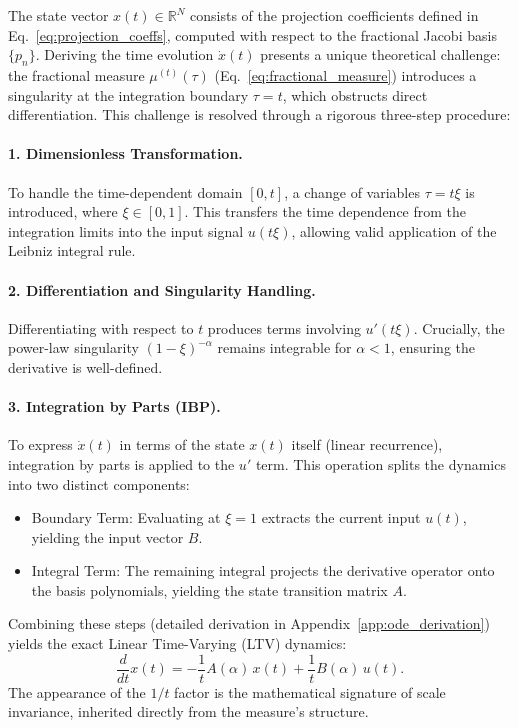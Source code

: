 \documentclass{article}
\theoremstyle{plain}
\theoremstyle{definition}
\theoremstyle{remark}
\begin{document}
The state vector $x(t) \in \mathbb{R}^N$ consists of the projection coefficients defined in Eq.~\eqref{eq:projection_coeffs}, computed with respect to the fractional Jacobi basis $\{p_n\}$.
Deriving the time evolution $\dot{x}(t)$ presents a unique theoretical challenge: the fractional measure $\mu^{(t)}(\tau)$ (Eq.~\ref{eq:fractional_measure}) introduces a singularity at the integration boundary $\tau=t$, which obstructs direct differentiation. This challenge is resolved through a rigorous three-step procedure:

\paragraph{1. Dimensionless Transformation.}
To handle the time-dependent domain $[0, t]$, a change of variables $\tau = t\xi$ is introduced, where $\xi \in [0, 1]$. This transfers the time dependence from the integration limits into the input signal $u(t\xi)$, allowing valid application of the Leibniz integral rule.

\paragraph{2. Differentiation and Singularity Handling.}
Differentiating with respect to $t$ produces terms involving $u'(t\xi)$. Crucially, the power-law singularity $(1-\xi)^{-\alpha}$ remains integrable for $\alpha < 1$, ensuring the derivative is well-defined.

\paragraph{3. Integration by Parts (IBP).}
To express $\dot{x}(t)$ in terms of the state $x(t)$ itself (linear recurrence), integration by parts is applied to the $u'$ term. This operation splits the dynamics into two distinct components:
\begin{itemize}
	\item Boundary Term: Evaluating at $\xi=1$ extracts the current input $u(t)$, yielding the input vector $B$.
	\item Integral Term: The remaining integral projects the derivative operator onto the basis polynomials, yielding the state transition matrix $A$.
\end{itemize}

Combining these steps (detailed derivation in Appendix~\ref{app:ode_derivation}) yields the exact Linear Time-Varying (LTV) dynamics:
\begin{equation}
	\frac{d}{dt} x(t) = -\frac{1}{t} A(\alpha) \, x(t) + \frac{1}{t} B(\alpha) \, u(t).
	\label{eq:hippo_ode}
\end{equation}
The appearance of the $1/t$ factor is the mathematical signature of scale invariance, inherited directly from the measure's structure.
\end{document}
